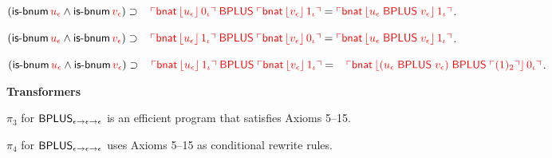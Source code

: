 \begin{biformthy}
    \item $(\mbox{\sf is-bnum} \, \textcolor{red}{u_\epsilon} \wedge \mbox{\sf is-bnum}
      \, \textcolor{red}{v_\epsilon}) \supset {}\\
        \hspace*{2ex} \textcolor{red}{\ulcorner\mbox{\sf bnat} \,
            \lfloor u_\epsilon\rfloor \, 0_\iota\urcorner \; \mbox{\sf BPLUS} \;
          \ulcorner\mbox{\sf bnat} \, \lfloor v_\epsilon\rfloor \, 1_\iota\urcorner} =
        \textcolor{red}{\ulcorner\mbox{\sf bnat} \, \lfloor u_\epsilon \;
              \mbox{\sf BPLUS} \; v_\epsilon\rfloor \, 1_\iota\urcorner}$.

    \item $(\mbox{\sf is-bnum} \, \textcolor{red}{u_\epsilon} \wedge \mbox{\sf is-bnum}
      \, \textcolor{red}{v_\epsilon}) \supset {}\\
        \hspace*{2ex} \textcolor{red}{\ulcorner\mbox{\sf bnat} \,
            \lfloor u_\epsilon\rfloor \, 1_\iota\urcorner \; \mbox{\sf BPLUS} \;
          \ulcorner\mbox{\sf bnat} \, \lfloor v_\epsilon\rfloor \, 0_\iota\urcorner} =
        \textcolor{red}{\ulcorner\mbox{\sf bnat} \, \lfloor u_\epsilon \;
              \mbox{\sf BPLUS} \; v_\epsilon\rfloor \, 1_\iota\urcorner}$.

    \item $(\mbox{\sf is-bnum} \, \textcolor{red}{u_\epsilon} \wedge \mbox{\sf is-bnum}
      \, \textcolor{red}{v_\epsilon}) \supset {}\\
        \hspace*{2ex} \textcolor{red}{\ulcorner\mbox{\sf bnat} \,
            \lfloor u_\epsilon\rfloor \, 1_\iota\urcorner \; \mbox{\sf BPLUS} \;
          \ulcorner\mbox{\sf bnat} \, \lfloor v_\epsilon\rfloor \, 1_\iota\urcorner} = {}\\
        \hspace*{2ex}\textcolor{red}{\ulcorner\mbox{\sf bnat} \,
            \lfloor(u_\epsilon \; \mbox{\sf BPLUS} \; v_\epsilon)
              \; \mbox{\sf BPLUS} \; \ulcorner(1)_2\urcorner\rfloor \, 0_\iota\urcorner}$.

  \ee

  \item[] \textbf{Transformers}

  \be

      \setcounter{enumi}{2}

    \item $\pi_3$ for $\mbox{\sf BPLUS}_{\epsilon \rightarrow \epsilon
      \rightarrow \epsilon}$ is an efficient program that satisfies Axioms
      5--15.

    \item $\pi_4$ for $\mbox{\sf BPLUS}_{\epsilon \rightarrow \epsilon
      \rightarrow \epsilon}$ uses Axioms 5--15 as conditional rewrite
      rules.


\end{biformthy}
